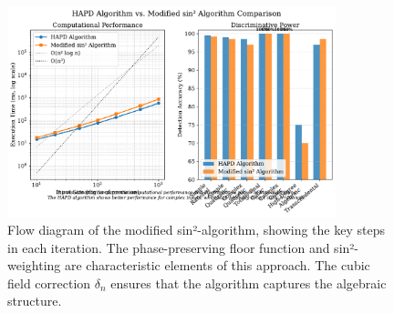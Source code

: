 
\begin{figure}[p]
\centering
\includegraphics[width=0.85\textwidth]{../figures/sin2_algorithm_flow.pdf}

\caption{Flow diagram of the modified sin²-algorithm, showing the key steps in each iteration. The phase-preserving floor function and sin²-weighting are characteristic elements of this approach. The cubic field correction $\delta_n$ ensures that the algorithm captures the algebraic structure.}
\label{fig:sin2_algorithm}
\end{figure} 